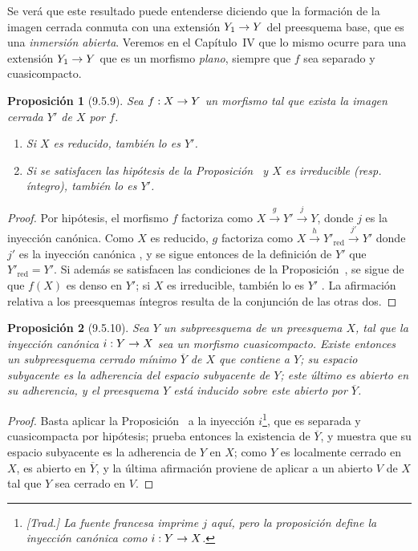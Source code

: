 \documentclass[oneside]{amsart}
\theoremstyle{ega-env-style}
\theoremstyle{ega-thm-env-style}
\newtheorem*{proposition}{Proposición}
\theoremstyle{ega-defn-env-style}
\renewcommand{\to}{\mathchoice{\longrightarrow}{\rightarrow}{\rightarrow}{\rightarrow}}
\let\EGAOriginalLabel\label
\renewcommand{\label}[1]{\phantomsection\EGAOriginalLabel{#1}}
\begin{document}
Se verá que este resultado puede entenderse diciendo que la formación de la imagen cerrada conmuta con una extensión $Y_1\to Y$ del preesquema base, que es una \emph{inmersión abierta}.
Veremos en el Capítulo~IV que lo mismo ocurre para una extensión $Y_1\to Y$ que es un morfismo \emph{plano}, siempre que $f$ sea separado y cuasicompacto.

\begin{proposition}[9.5.9]
\label{I.9.5.9}
Sea $f:X\to Y$ un morfismo tal que exista la imagen cerrada $Y'$ de $X$ por $f$.
\begin{enumerate}
  \item[{\rm(i)}] Si $X$ es reducido, también lo es $Y'$.
  \item[{\rm(ii)}] Si se satisfacen las hipótesis de la Proposición~ y $X$ es irreducible \textup{(resp.} íntegro), también lo es $Y'$.
\end{enumerate}
\end{proposition}

\begin{proof}
Por hipótesis, el morfismo $f$ factoriza como $X\xrightarrow{g}Y'\xrightarrow{j}Y$, donde $j$ es la inyección canónica.
Como $X$ es reducido, $g$ factoriza como $X\xrightarrow{h}Y'_{\mathrm{red}}\xrightarrow{j'}Y'$ donde $j'$ es la inyección canónica , y se sigue entonces de la definición de $Y'$ que $Y'_{\mathrm{red}}=Y'$.
Si además se satisfacen las condiciones de la Proposición~, se sigue de  que $f(X)$ es denso en $Y'$; si $X$ es irreducible, también lo es $Y'$ .
La afirmación relativa a los preesquemas íntegros resulta de la conjunción de las otras dos.
\end{proof}

\begin{proposition}[9.5.10]
\label{I.9.5.10}
Sea $Y$ un subpreesquema de un preesquema $X$, tal que la inyección canónica $i:Y\to X$ sea un morfismo cuasicompacto.
Existe entonces un subpreesquema cerrado mínimo $\overline{Y}$ de $X$ que contiene a $Y$; su espacio subyacente es la adherencia del espacio subyacente de $Y$; este último es abierto en su adherencia, y el preesquema $Y$ está inducido sobre este abierto por $\overline{Y}$.
\end{proposition}

\begin{proof}
Basta aplicar la Proposición~ a la inyección $i$\footnote{\emph{[Trad.] La fuente francesa imprime $j$ aquí, pero la proposición define la inyección canónica como $i:Y\to X$.}}, que es separada  y cuasicompacta por hipótesis;  prueba entonces la existencia de $\overline{Y}$, y  muestra que su espacio subyacente es la adherencia de $Y$ en $X$; como $Y$ es localmente cerrado en $X$, es abierto en $\overline{Y}$, y la última afirmación proviene de aplicar  a un abierto $V$ de $X$ tal que $Y$ sea cerrado en $V$.
\end{proof}
\end{document}
